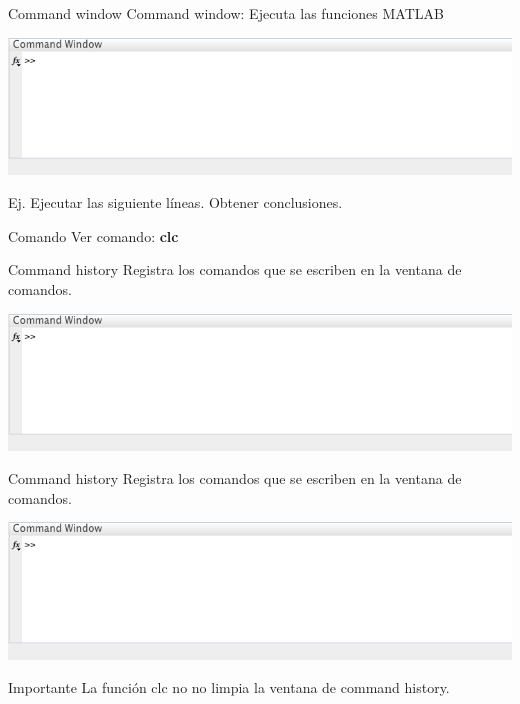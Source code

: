 \documentclass{bredelebeamer}
\begin{document}
\begin{frame}{Command window}
Command window: Ejecuta las funciones MATLAB\\
\begin{center}
\includegraphics[scale=0.3]{images/pantalla2.png}
\end{center}
Ej. Ejecutar las siguiente líneas. Obtener conclusiones.
\begin{exampleblock}{Comando}
Ver comando: \textbf{clc}
\end{exampleblock}
\end{frame}

\begin{frame}{Command history}
Registra los comandos que se escriben en la ventana de comandos.
\begin{center}
\includegraphics[scale=0.3]{images/pantalla2.png}
\end{center}
\end{frame}

\begin{frame}{Command history}
Registra los comandos que se escriben en la ventana de comandos.
\begin{center}
\includegraphics[scale=0.3]{images/pantalla2.png}
\end{center}
\begin{alertblock}{Importante}
La función clc no no limpia la ventana de command history.
\end{alertblock}
\end{frame}
\end{document}

